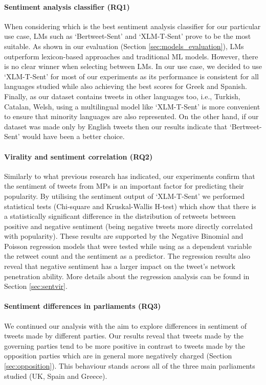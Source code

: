 \paragraph{Sentiment analysis classifier (RQ1)} When considering which is the best sentiment analysis classifier for our particular use case, \acp{LM} such as `Bertweet-Sent' and `XLM-T-Sent' prove to be the most suitable. As shown in our evaluation (Section \ref{sec:models_evaluation}), \acp{LM} outperform lexicon-based approaches and traditional \ac{ML} models. However, there is no clear winner when selecting between \acp{LM}. In our use case, we decided to use `XLM-T-Sent' for most of our experiments as its performance is consistent for all languages studied while also achieving the best scores for Greek and Spanish. Finally, as our dataset contains tweets in other languages too, i.e., Turkish, Catalan, Welsh, using a multilingual model like `XLM-T-Sent' is more convenient to ensure that minority languages are also represented. On the other hand, if our dataset was made only by English tweets then our results indicate that `Bertweet-Sent' would have been a better choice.

\paragraph{Virality and sentiment correlation (RQ2)} Similarly to what previous research has indicated, our experiments confirm that the sentiment of tweets from \acp{MP} is an important factor for predicting their popularity. By utilising the sentiment output of `XLM-T-Sent' we performed statistical tests (Chi-square and Kruskal-Wallis H-test) which show that there is a statistically significant difference in the distribution of retweets between positive and negative sentiment (being negative tweets more directly correlated with popularity). These results are supported by the Negative Binomial and Poisson regression models that were tested while using as a dependent variable the retweet count and the sentiment as a predictor. The regression results also reveal that negative sentiment has a larger impact on the tweet's network penetration ability. More details about the regression analysis can be found in Section \ref{sec:sentvir}. 

\paragraph{Sentiment differences in parliaments (RQ3)} We continued our analysis with the aim to explore differences in sentiment of tweets made by different parties. Our results reveal that tweets made by the governing parties tend to be more positive in contrast to tweets made by the opposition parties which are in general more negatively charged (Section \ref{sec:opposition}). This behaviour stands across all of the three main parliaments studied (UK, Spain and Greece).

